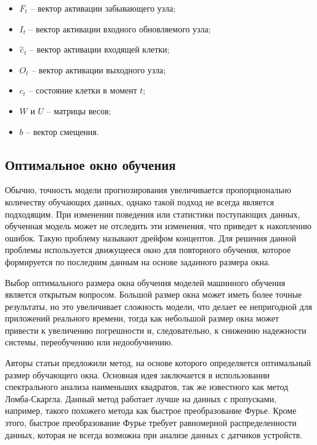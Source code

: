\newpage

\begin{itemize}
    \item $F_t$ -- вектор активации забывающего узла;
    \item $I_t$ -- вектор активации входного обновляемого узла;
    \item $\stackrel{\sim}{c}_t$ -- вектор активации входящей клетки;
    \item $O_t$ -- вектор активации выходного узла;
    \item $c_t$ -- состояние клетки в момент $t$;
    \item $W$ и $U$ -- матрицы весов;
    \item $b$ -- вектор смещения.
\end{itemize}


\subsection{Оптимальное окно обучения}

Обычно, точность модели прогнозирования увеличивается
пропорционально количеству обучающих данных,
однако такой подход не всегда является подходящим.
При изменении поведения или статистики поступающих данных,
обученная модель может не отследить эти изменения,
что приведет к накоплению ошибок.
Такую проблему называют дрейфом концептов.
Для решения данной проблемы используется
движущееся окно для повторного обучения,
которое формируется по последним данным на основе заданного размера окна.

Выбор оптимального размера окна обучения моделей машинного обучения
является открытым вопросом.
Большой размер окна может иметь более точные результаты,
но это увеличивает сложность модели,
что делает ее непригодной для приложений реального времени,
тогда как небольшой размер окна
может привести к увеличению погрешности и, следовательно,
к снижению надежности системы, переобучению или недообучнению.

Авторы статьи \cite{optimal} предложили метод,
на основе которого определяется оптимальный размер обучающего окна.
Основная идея заключается в использовании 
спектрального анализа наименьших квадратов,
так же известного как метод Ломба-Скаргла.
Данный метод работает лучше на данных с пропусками, например,
такого похожего метода как быстрое преобразование Фурье.
Кроме этого, быстрое преобразование Фурье
требует равномерной распределенности данных,
которая не всегда возможна при анализе данных с датчиков устройств.

